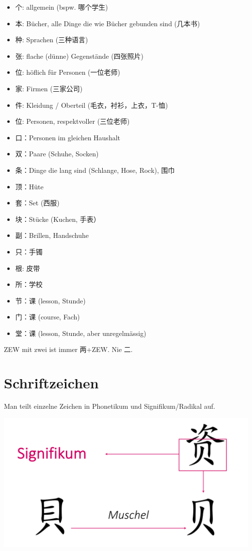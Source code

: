 \documentclass[UTF8]{ctexart}
\begin{document}
\begin{itemize}
    \item 个: allgemein (bspw. 哪个学生)
    \item 本: Bücher, alle Dinge die wie Bücher gebunden sind (几本书)
    \item 种: Sprachen (三种语言)
    \item 张: flache (dünne) Gegenstände (四张照片)
    \item 位: höflich für Personen (一位老师)
    \item 家: Firmen (三家公司)
    \item 件: Kleidung / Oberteil (毛衣，衬衫，上衣，T-恤)
    \item 位: Personen, respektvoller (三位老师)
    \item 口：Personen im gleichen Haushalt
    \item 双：Paare (Schuhe, Socken)
    \item 条：Dinge die lang sind (Schlange, Hose, Rock), 围巾
    \item 顶：Hüte
    \item 套：Set (西服)
    \item 块：Stücke (Kuchen, 手表）
    \item 副：Brillen, Handschuhe
    \item 只：手镯
    \item 根: 皮带
    \item 所：学校
    \item 节：课 (lesson, Stunde)
    \item 门：课 (course, Fach)
    \item 堂：课 (lesson, Stunde, aber unregelmässig)
\end{itemize}

ZEW mit zwei ist immer 两+ZEW. Nie 二.

\section{Schriftzeichen}

Man teilt einzelne Zeichen in Phonetikum und Signifikum/Radikal auf.

\includegraphics[width=\linewidth]{signifikum.png}
\end{document}
